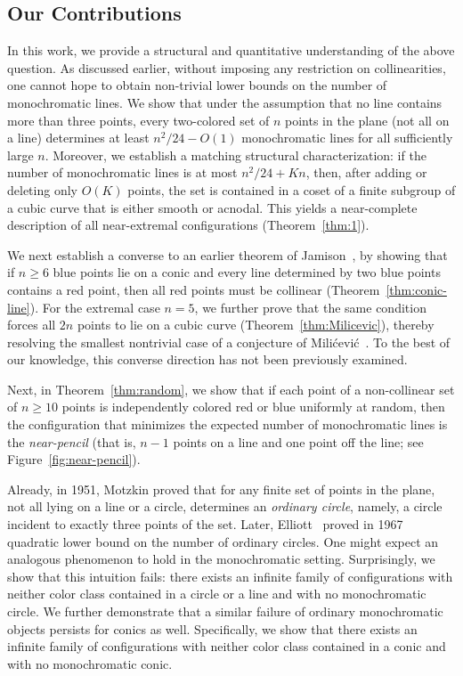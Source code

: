 \documentclass[a4paper,11pt,leqno]{article}
\begin{document}
\subsection{Our Contributions}
In this work, we provide a structural and quantitative understanding of the above question. As discussed earlier, without imposing any restriction on collinearities, one cannot hope to obtain non-trivial lower bounds on the number of monochromatic lines. We show that under the assumption that no line contains more than three points, every two-colored set of $n$ points in the plane (not all on a line) determines at least $n^{2}/24 - O(1)$ monochromatic lines for all sufficiently large $n$. Moreover, we establish a matching structural characterization: if the number of monochromatic lines is at most $n^{2}/24 + K n$, then, after adding or deleting only $O(K)$ points, the set is contained in a coset of a finite subgroup of a cubic curve that is either smooth or acnodal. This yields a near-complete description of all near-extremal configurations 
(Theorem~\ref{thm:1}).

We next establish a converse to an earlier theorem of Jamison~\cite{jamison1986few}, by showing that if $n\ge 6$ blue points lie on a conic and every line determined by two blue points contains a red point, then all red points must be collinear (Theorem~\ref{thm:conic-line}). For the extremal case $n=5$, we further prove that the same condition forces all $2n$ points to lie on a cubic curve (Theorem~\ref{thm:Milicevic}), thereby resolving the smallest nontrivial case of a conjecture of Mili\'cevi\'c~\cite{milicevic2018}. To the best of our knowledge, this converse direction has not been previously examined.

Next, in Theorem~\ref{thm:random}, we show that if each point of a non-collinear set of $n \ge 10$ points is independently colored red or blue uniformly at random, then the configuration that minimizes the expected number of monochromatic lines is the \emph{near-pencil} (that is, $n-1$ points on a line and one point off the line; see Figure~\ref{fig:near-pencil}).

Already, in 1951, Motzkin \cite{motzkin1951lines} proved that for any finite set of points in the plane, not all lying on a line or a circle, determines an \emph{ordinary circle}, namely, a circle incident to exactly three points of the set.
Later, Elliott~\cite{elliott1967} proved in 1967 
quadratic lower bound on the number of ordinary circles.
One might expect an analogous phenomenon to hold in the monochromatic setting. Surprisingly, we show that this intuition fails: there exists an infinite family of configurations with neither color class contained in a circle or a line and with no monochromatic circle. 
We further demonstrate that a similar failure of ordinary monochromatic objects persists for conics as well. Specifically, we show that there exists an infinite family of configurations with neither color class contained in a conic and with no monochromatic conic.
\end{document}
